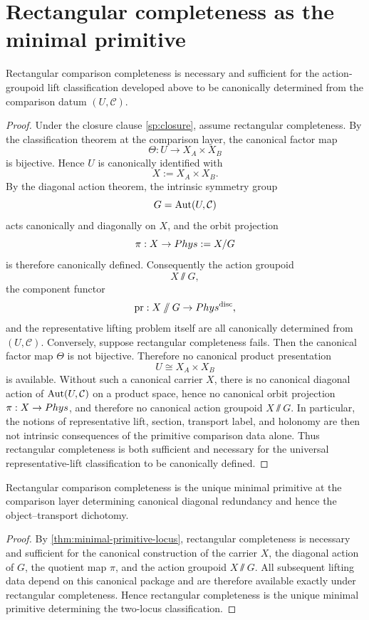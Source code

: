 \section{Rectangular completeness as the minimal primitive}
\begin{theorem}
	\label{thm:minimal-primitive-locus}
	Rectangular comparison completeness is necessary and sufficient for the
	action-groupoid lift classification developed above to be canonically
	determined from the comparison datum \((U,\mathcal C)\).
\end{theorem}
\begin{proof}
	Under the closure clause \cref{sp:closure}, assume rectangular
	completeness.  By the classification theorem at the
	comparison layer, the canonical factor map
	\[
		\Theta:U\to X_A\times X_B
	\]
	is bijective.  Hence \(U\) is canonically identified with
	\[
		X:=X_A\times X_B.
	\]
	By the diagonal action theorem, the intrinsic symmetry group
	\[
		G=\operatorname{Aut}(U,\mathcal C)
	\]
	acts canonically and diagonally on \(X\), and the orbit projection
	\[
		\pi:X\to Phys:=X/G
	\]
	is therefore canonically defined.  Consequently the action groupoid
	\[
		X\sslash G,
	\]
	the component functor
	\[
		\operatorname{pr}:X\mathbin{/\mkern-6mu/} G\to Phys^{\mathrm{disc}},
	\]
	and the representative lifting problem itself are all canonically
	determined from \((U,\mathcal C)\).
	Conversely, suppose rectangular completeness fails.  Then the canonical
	factor map \(\Theta\) is not bijective.  Therefore no canonical product
	presentation
	\[
		U\cong X_A\times X_B
	\]
	is available.  Without such a canonical carrier \(X\), there is no
	canonical diagonal action of \(\operatorname{Aut}(U,\mathcal C)\) on a product space,
	hence no canonical orbit projection \(\pi:X\to Phys\), and therefore
	no canonical action groupoid \(X\sslash G\).  In particular, the notions
	of representative lift, section, transport label, and holonomy are then
	not intrinsic consequences of the primitive comparison data alone.
	Thus rectangular completeness is both sufficient and necessary for the
	universal representative-lift classification to be canonically defined.
\end{proof}
\begin{corollary}
	Rectangular comparison completeness is the unique minimal primitive at
	the comparison layer determining canonical diagonal redundancy and hence the
	object--transport dichotomy.
\end{corollary}
\begin{proof}
	By \cref{thm:minimal-primitive-locus}, rectangular completeness is
	necessary and sufficient for the canonical construction of the carrier
	\(X\), the diagonal action of \(G\), the quotient map \(\pi\), and the
	action groupoid \(X\sslash G\).  All subsequent lifting data depend on
	this canonical package and are therefore available exactly under
	rectangular completeness.  Hence rectangular completeness is the unique
	minimal primitive determining the two-locus classification.
\end{proof}
